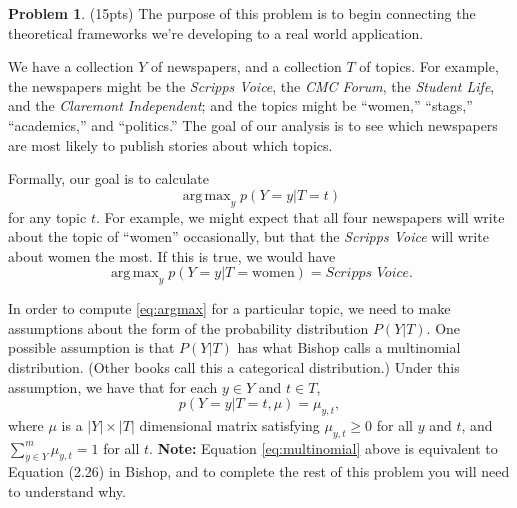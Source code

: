 \documentclass[10pt]{article}
\theoremstyle{definition}
\newtheorem{problem}{Problem}
\DeclareMathOperator*{\argmax}{arg\,max}
\begin{document}

\newpage
\begin{problem}
    (15pts) 
    The purpose of this problem is to begin connecting the theoretical frameworks we're developing to a real world application.

    We have a collection $Y$ of newspapers,
    and a collection $T$ of topics.
    For example, the newspapers might be the \emph{Scripps Voice}, the \emph{CMC Forum}, the \emph{Student Life}, and the \emph{Claremont Independent};
    and the topics might be ``women,'' ``stags,'' ``academics,'' and ``politics.'' 
    The goal of our analysis is to see which newspapers are most likely to publish stories about which topics.

    Formally, our goal is to calculate
    \begin{equation}
        \argmax_y p(Y=y|T=t)
        \label{eq:argmax}
    \end{equation}
    for any topic $t$.
    For example, we might expect that all four newspapers will write about the topic of ``women'' occasionally,
    but that the \emph{Scripps Voice} will write about women the most.
    If this is true, we would have 
    \begin{equation}
        \argmax_y p(Y=y|T=\text{women}) = \textit{Scripps Voice}
        .
    \end{equation}

    In order to compute \eqref{eq:argmax} for a particular topic,
    we need to make assumptions about the form of the probability distribution $P(Y|T)$.
    One possible assumption is that $P(Y|T)$ has what Bishop calls a multinomial distribution.
    (Other books call this a categorical distribution.)
    Under this assumption, we have that for each $y\in Y$ and $t\in T$,
    \begin{equation}
        p(Y=y|T=t,\mu) = \mu_{y,t},
        \label{eq:multinomial}
    \end{equation}
    where $\mu$ is a $|Y| \times |T|$ dimensional matrix satisfying $\mu_{y,t}\ge0$ for all $y$ and $t$, and $\sum_{y\in Y}^m\mu_{y,t}=1$ for all $t$.
    \textbf{Note:} Equation \eqref{eq:multinomial} above is equivalent to Equation (2.26) in Bishop,
    and to complete the rest of this problem you will need to understand why.


\end{problem}
\end{document}
